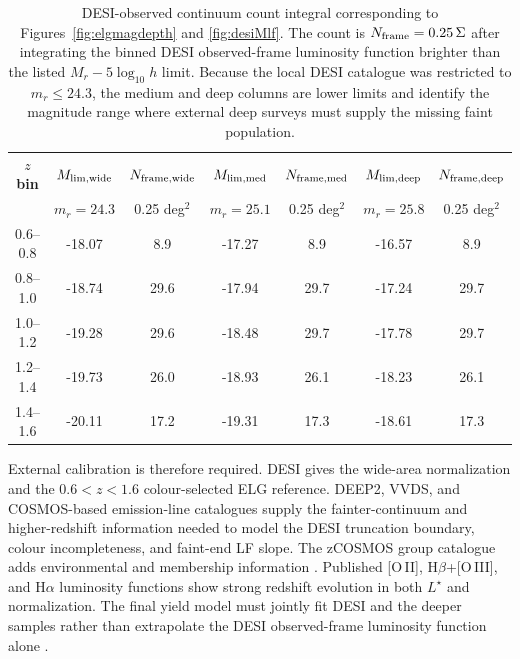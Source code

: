 \begin{table}[htbp]
\centering
\sffamily\scriptsize
\begin{tabularx}{\textwidth}{@{}c c c c c c c@{}}
\toprule
\textbf{$z$ bin} &
\textbf{$M_{\rm lim,wide}$} & \textbf{$N_{\rm frame,wide}$} &
\textbf{$M_{\rm lim,med}$} & \textbf{$N_{\rm frame,med}$} &
\textbf{$M_{\rm lim,deep}$} & \textbf{$N_{\rm frame,deep}$}\\
 & \multicolumn{1}{c}{$m_r=24.3$} & \multicolumn{1}{c}{0.25 deg$^2$} &
   \multicolumn{1}{c}{$m_r=25.1$} & \multicolumn{1}{c}{0.25 deg$^2$} &
   \multicolumn{1}{c}{$m_r=25.8$} & \multicolumn{1}{c}{0.25 deg$^2$}\\
\midrule
0.6--0.8 & -18.07 & 8.9 & -17.27 & 8.9 & -16.57 & 8.9\\
0.8--1.0 & -18.74 & 29.6 & -17.94 & 29.7 & -17.24 & 29.7\\
1.0--1.2 & -19.28 & 29.6 & -18.48 & 29.7 & -17.78 & 29.7\\
1.2--1.4 & -19.73 & 26.0 & -18.93 & 26.1 & -18.23 & 26.1\\
1.4--1.6 & -20.11 & 17.2 & -19.31 & 17.3 & -18.61 & 17.3\\
\bottomrule
\end{tabularx}
\caption{DESI-observed continuum count integral corresponding to Figures~\ref{fig:elgmagdepth} and \ref{fig:desiMlf}. The count is $N_{\rm frame}=0.25\,\Sigma$ after integrating the binned DESI observed-frame luminosity function brighter than the listed $M_r-5\log_{10}h$ limit. Because the local DESI catalogue was restricted to $m_r\le24.3$, the medium and deep columns are lower limits and identify the magnitude range where external deep surveys must supply the missing faint population.}
\label{tab:desiMcounts}
\end{table}

External calibration is therefore required. DESI gives the wide-area normalization and the $0.6<z<1.6$ colour-selected ELG reference. DEEP2, VVDS, and COSMOS-based emission-line catalogues supply the fainter-continuum and higher-redshift information needed to model the DESI truncation boundary, colour incompleteness, and faint-end LF slope. The zCOSMOS group catalogue adds environmental and membership information \cite{newman2013deep2,lefevre2013vvds,saito2020,knobel2012zcosmos}. Published [O\,II], H$\beta$+[O\,III], and H$\alpha$ luminosity functions show strong redshift evolution in both $L^\star$ and normalization. The final yield model must jointly fit DESI and the deeper samples rather than extrapolate the DESI observed-frame luminosity function alone \cite{comparat2015,comparat2016,khostovan2015,mehta2015}.

